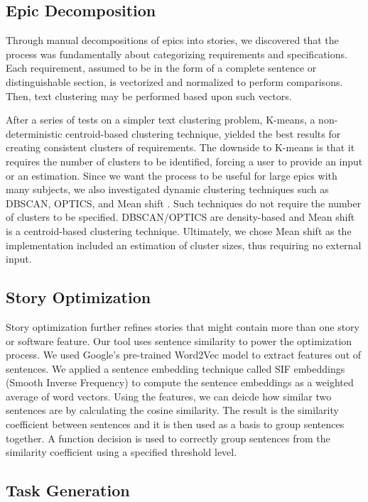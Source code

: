 \subsection{Epic Decomposition}
Through manual decompositions of epics into stories, we discovered that the process was fundamentally about categorizing requirements and specifications. Each requirement, assumed to be in the form of a complete sentence or distinguishable section, is vectorized and normalized to perform comparisons. Then, text clustering may be performed based upon such vectors. 

After a series of tests on a simpler text clustering problem, K-means, a non-deterministic centroid-based clustering technique, yielded the best results for creating consistent clusters of requirements. The downside to K-means is that it requires the number of clusters to be identified, forcing a user to provide an input or an estimation. Since we want the process to be useful for large epics with many subjects, we also investigated dynamic clustering techniques such as DBSCAN, OPTICS, and Mean shift \cite{}. Such techniques do not require the number of clusters to be specified. DBSCAN/OPTICS are density-based and Mean shift is a centroid-based clustering technique. Ultimately, we chose Mean shift as the implementation included an estimation of cluster sizes, thus requiring no external input.

\subsection{Story Optimization}
Story optimization further refines stories that might contain more than one story or software feature. Our tool uses sentence similarity to power the optimization process. We used Google's pre-trained Word2Vec model\cite{googleword2vec} to extract features out of sentences. We applied a sentence embedding technique called SIF embeddings (Smooth Inverse Frequency) to compute the sentence embeddings as a weighted average of word vectors. Using the features, we can deicde how similar two sentences are by calculating the cosine similarity. 
The result is the similarity coefficient between sentences and it is then used as a basis to group sentences together. A function decision is used to correctly group sentences from the similarity coefficient using a specified threshold level. 

\subsection{Task Generation}

